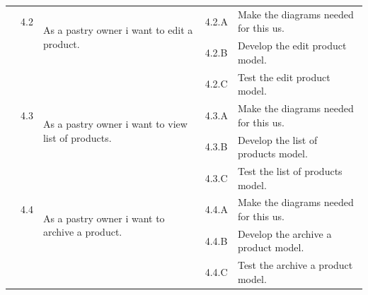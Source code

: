 \documentclass[12pt,a4paper]{report}
\begin{document}
\begin{table}[H]
\begin{center}
\begin{tabular}{|  p{3cm}|  p{1cm}| p{4cm}|  p{1cm}| p{6cm}|}
				&                       
				4.2  &  
				\multirow{2}{4cm}{As a pastry owner i want to edit a product.}
				
				&				                      
				4.2.A &                        
				Make the diagrams needed for this \ac{us}.
				\\ 
				\cline{4-5}    
				&                   
				&                                 
				&                        
				4.2.B &                        
				Develop the edit product model.
				\\ 
				\cline{4-5}    
				&                   
				&                                 
				&                        
				4.2.C &                        
				Test the edit product model.
				\\
				\cline{2-5}  
				
				&                       
				4.3  &  
				\multirow{2}{4cm}{As a pastry owner i want to view list of products.}
				
				&				                      
				4.3.A &                        
				Make the diagrams needed for this \ac{us}.
				\\ 
				\cline{4-5}    
				&                   
				&                                 
				&                        
				4.3.B &                        
				Develop the list of products model.
				\\ 
				\cline{4-5}    
				&                   
				&                                 
				&                        
				4.3.C &                        
				Test the list of products model.
				\\
				\cline{2-5}  
				
				&                       
				4.4  &  
				\multirow{2}{4cm}{As a pastry owner i want to archive a product.}
				
				&				                      
				4.4.A &                        
				Make the diagrams needed for this \ac{us}.
				\\ 
				\cline{4-5}    
				&                   
				&                                 
				&                        
				4.4.B &                        
				Develop the archive a product model.
				\\ 
				\cline{4-5}    
				&                   
				&                                 
				&                        
				4.4.C &                        
				Test the archive a product model.
				
				\\
				\hline
				
				
				
			\end{tabular}
			
		\end{center}
		
	\end{table}
\end{document}
